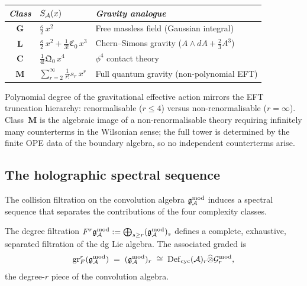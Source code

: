 \begin{remark}
\begin{center}
\small
\renewcommand{\arraystretch}{1.25}
\begin{tabular}{cll}
\toprule
\emph{Class} & $S_{\mathcal{A}}(x)$ &
\emph{Gravity analogue} \\
\midrule
$\mathbf{G}$ &
 $\frac{\kappa}{2}\,x^2$ &
 Free massless field (Gaussian integral) \\
$\mathbf{L}$ &
 $\frac{\kappa}{2}\,x^2 + \frac{1}{3!}\mathfrak{C}_0\,x^3$ &
 Chern--Simons gravity ($A\wedge dA + \frac{2}{3}A^3$) \\
$\mathbf{C}$ &
 $\frac{1}{4!}\mathfrak{Q}_0\,x^4$ &
 $\phi^4$ contact theory \\
$\mathbf{M}$ &
 $\sum_{r=2}^\infty \frac{1}{r!}s_r\,x^r$ &
 Full quantum gravity (non-polynomial EFT) \\
\bottomrule
\end{tabular}
\end{center}
Polynomial degree of the gravitational effective action
mirrors the EFT truncation hierarchy: renormalisable ($r \leq 4$)
versus non-renormalisable ($r = \infty$). Class~$\mathbf{M}$ is
the algebraic image of a non-renormalisable theory requiring
infinitely many counterterms in the Wilsonian sense; the full
tower is determined by the finite OPE data of the boundary
algebra, so no independent counterterms arise.
\end{remark}



\subsection{The holographic spectral sequence}

The collision filtration on the convolution algebra
$\mathfrak{g}_{\mathcal{A}}^{\mathrm{mod}}$ induces a spectral sequence that separates the
contributions of the four complexity classes.

\begin{construction}
The degree filtration
$F^r\mathfrak{g}_{\mathcal{A}}^{\mathrm{mod}} := \bigoplus_{s \geq r}(\mathfrak{g}_{\mathcal{A}}^{\mathrm{mod}})_s$
defines a complete, exhaustive, separated filtration
of the dg Lie algebra. The associated graded is
\begin{equation}%
\operatorname{gr}^r_F(\gAmod)
\;=\;
(\gAmod)_r
\;\cong\;
\Defcyc(\cA)_r \widehat\otimes \Gmod_r,
\end{equation}
the degree-$r$ piece of the convolution algebra.
\end{construction}

